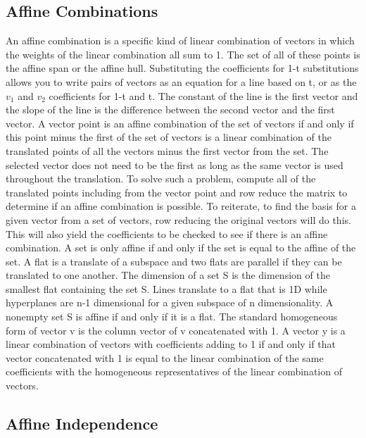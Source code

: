\documentclass[12pt]{article}
\begin{document}
\subsection{Affine Combinations}
An affine combination is a specific kind of linear combination of vectors in which the weights of the linear combination all sum to 1. The set of all of these points is the affine span 
or the affine hull. Substituting the coefficients for 1-t substitutions allows you to write pairs of vectors as an equation for a line based on t, or as the $v_1$ and $v_2$ coefficients 
for 1-t and t. The constant of the line is the first vector and the slope of the line is the difference between the second vector and the first vector. A vector point is an affine 
combination of the set of vectors if and only if this point minus the first of the set of vectors is a linear combination of the translated points of all the vectors minus the first vector 
from the set. The selected vector does not need to be the first as long as the same vector is used throughout the translation. To solve such a problem, compute all of the translated 
points including from the vector point and row reduce the matrix to determine if an affine combination is possible. 
\newline
\newline
To reiterate, to find the basis for a given vector from a set of vectors, row reducing the original vectors will do this. This will also yield the coefficients to be checked to see if there 
is an affine combination. A set is only affine if and only if the set is equal to the affine of the set. A flat is a translate of a subspace and two flats are parallel if they can be translated 
to one another. The dimension of a set S is the dimension of the smallest flat containing the set S. Lines translate to a flat that is 1D while hyperplanes are n-1 dimensional for a 
given subspace of n dimensionality. A nonempty set S is affine if and only if it is a flat. 
\newline
\newline
The standard homogeneous form of vector v is the column vector of v concatenated with 1. A vector y is a linear combination of vectors with coefficients adding to 1 if and only if that 
vector concatenated with 1 is equal to the linear combination of the same coefficients with the homogeneous representatives of the linear combination of vectors. 
\subsection{Affine Independence}
\end{document}
